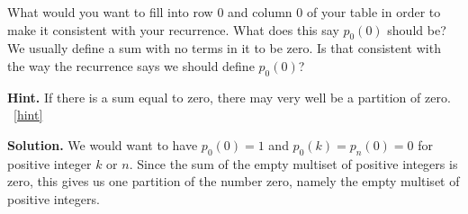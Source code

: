 \documentclass{book}
\begin{document}
\begin{activity}[]
\begin{enumerate}[font=\bfseries,label=(\alph*),ref=\alph*]
What would you want to fill into row 0 and column 0 of your table in order to make it consistent with your recurrence.  What does this say \(p_0(0)\) should be?  We usually define a sum with no terms in it to be zero. Is that consistent with the way the recurrence says we should define \(p_0(0)\)?%
\par\smallskip%
\noindent\textbf{Hint.}\hypertarget{hint-138}{}\quad%
\hypertarget{p-1178}{}%
If there is a sum equal to zero, there may very well be a partition of zero.%
~\hfill{\tiny\hyperlink{a-215.h}{[hint]}\hypertarget{q-215.h}{}}\par\smallskip%
\noindent\textbf{Solution.}\hypertarget{solution-112}{}\quad%
\hypertarget{p-1179}{}%
We would want to have \(p_0(0)=1\) and \(p_0(k)=p_n(0)=0\) for positive integer \(k\) or \(n\). Since the sum of the empty multiset of positive integers is zero, this gives us one partition of the number zero, namely the empty multiset of positive integers.%
\end{enumerate}
\end{activity}

\clearpage
\end{document}
